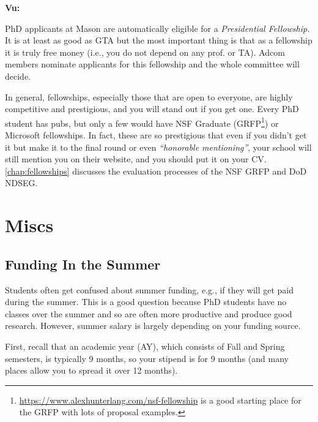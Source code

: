 \documentclass[oneside,11pt,dvipsnames]{book}
\newenvironment{commentbox}[1][]{
  \small
  \begin{mybox}
    {\small \textbf{#1}}
  }{
  \end{mybox}
}
\begin{document}
\begin{commentbox}[Vu:]
  PhD applicants at Mason are automatically eligible for a \emph{Presidential Fellowship}.  It is at least as good as GTA but the most important thing is that as a fellowship it is truly free money (i.e., you do not depend on any prof. or TA).  Adcom members nominate applicants for this fellowship and the whole committee will decide.
\end{commentbox}


In general, fellowships, especially those that are open to everyone, are highly competitive and prestigious, and you will stand out if you get one.  Every PhD student has pubs, but only a few would have NSF Graduate (GRFP\footnote{\url{https://www.alexhunterlang.com/nsf-fellowship} is a good starting place for the GRFP with lots of proposal examples.}) or Microsoft fellowships. In fact, these are so prestigious that even if you didn't get it but make it to the final round or even \emph{``honorable mentioning''}, your school will still mention you on their website, and you should put it on your CV. \autoref{chap:fellowships} discusses the evaluation processes of the NSF GRFP and DoD NDSEG.

\section{Miscs}

\subsection{Funding In the Summer}\label{sec:summer-funding}

Students often get confused about summer funding, e.g., if they will get paid during the summer.  This is a good question because PhD students have no classes over the summer and so are often more productive and produce good research. However, summer salary is largely depending on your funding source.

First, recall that an academic year (AY), which consists of Fall and Spring semesters, is typically 9 months, so your stipend is for 9 months (and many places allow you to spread it over 12 months).
\end{document}
